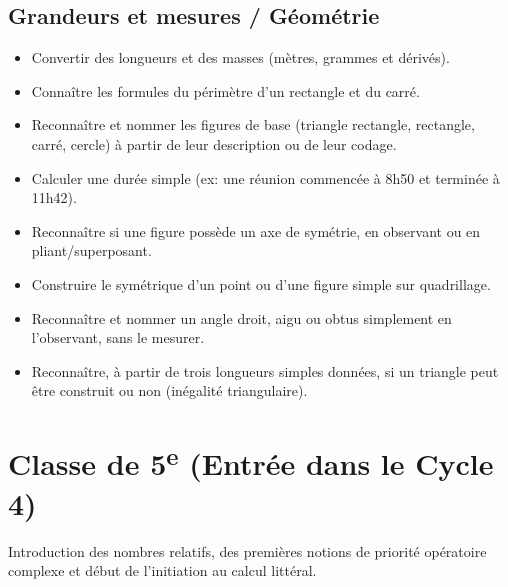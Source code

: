 \documentclass[11pt,a4paper]{article}
\begin{document}
\subsection*{Grandeurs et mesures / Géométrie}
\begin{itemize}[label=,leftmargin=*]
    \item Convertir des longueurs et des masses (mètres, grammes et dérivés).
    \item Connaître les formules du périmètre d'un rectangle et du carré.
    \item Reconnaître et nommer les figures de base (triangle rectangle, rectangle, carré, cercle) à partir de leur description ou de leur codage.
    \item Calculer une durée simple (ex: une réunion commencée à 8h50 et terminée à 11h42).
    \item Reconnaître si une figure possède un axe de symétrie, en observant ou en pliant/superposant.
    \item Construire le symétrique d'un point ou d'une figure simple sur quadrillage.
    \item Reconnaître et nommer un angle droit, aigu ou obtus simplement en l'observant, sans le mesurer.
    \item Reconnaître, à partir de trois longueurs simples données, si un triangle peut être construit ou non (inégalité triangulaire).
\end{itemize}

\section{Classe de 5\textsuperscript{e} (Entrée dans le Cycle 4)}
Introduction des nombres relatifs, des premières notions de priorité opératoire complexe et début de l'initiation au calcul littéral.
\end{document}

